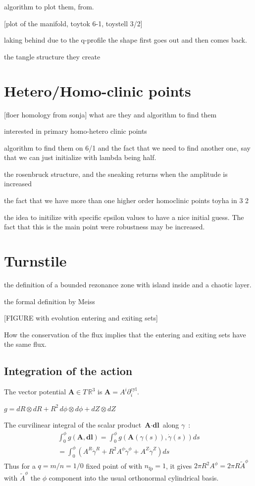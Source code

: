 algorithm to plot them, from.

[plot of the manifold, toytok 6-1, toystell 3/2]

laking behind due to the q-profile
the shape first goes out and then comes back.

the tangle structure they create

\section{Hetero/Homo-clinic points}
[floer homology from sonja]
what are they and algorithm to find them

interested in primary homo-hetero clinic points

algorithm to find them on 6/1 and the fact that we need to find another one, say that we can just initialize with lambda being half.

the rosenbruck structure, and the sneaking returns when the amplitude is increased

the fact that we have more than one
higher order homoclinic points
toyha in 3 2 

the idea to initilize with specific epsilon values to have a nice initial guess. The fact that this is the main point were robustness may be increased.

\section{Turnstile}

the definition of a bounded rezonance zone with island inside and a chaotic layer.

the formal definition by Meiss

[FIGURE with evolution entering and exiting sets]

How the conservation of the flux implies that the entering and exiting sets have the same flux.

\subsection{Integration of the action}

The vector potential $\textbf{A} \in T\,\mathbb{R}^3$ is $\textbf{A} =  A^i\partial_i^\text{cyl}$.

$g = dR\otimes dR + R^2\,d\phi\otimes d\phi + dZ\otimes dZ$

The curvilinear integral of the scalar product $\textbf{A}\cdot\textbf{dl}$ along $\gamma$~:
\begin{align*}
    \int_0^\phi g(\textbf{A},\textbf{dl}) = \int_0^\phi g(\textbf{A}(\gamma(s)),\dot{\gamma}(s))ds\\ = \int_0^\phi (A^R\dot{\gamma}^R + R^2A^\phi\dot{\gamma}^\phi + A^Z\dot{\gamma}^Z) ds
\end{align*}
Thus for a $q=m/n=1/0$ fixed point of with $n_\text{fp} = 1$, it gives $2\pi R^2A^\phi = 2\pi R\tilde{A}^\phi$ with $\tilde{A}^\phi$ the $\phi$ component into the usual orthonormal cylindrical basis.

